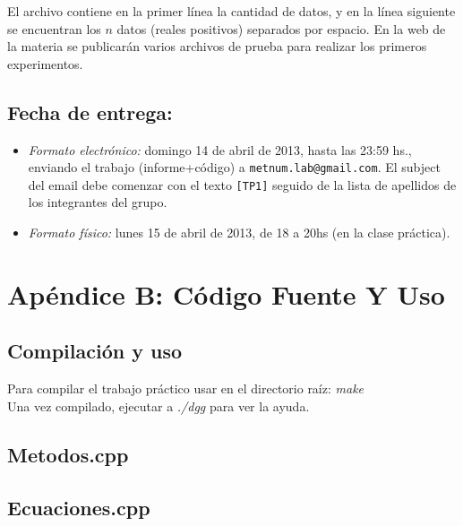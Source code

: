 \documentclass[a4paper,10pt,twoside]{article}
\begin{document}
\vspace{0.5cm}

El archivo contiene en la primer l\'inea la cantidad de datos, y en la l\'inea siguiente se encuentran los $n$ datos (reales positivos) separados por espacio. En la web de la materia se publicar\'an varios archivos de prueba para realizar los primeros experimentos.

\subsection{Fecha de entrega:} 

\begin{itemize}
\item \textsl{Formato electr\'onico:} domingo 14 de abril de 2013, hasta las 23:59 hs., enviando el trabajo (informe+c\'odigo) a \texttt{metnum.lab@gmail.com}. El subject del email debe comenzar con el texto \verb|[TP1]| seguido de la lista de apellidos de los integrantes del grupo. 
\item \textsl{Formato f\'isico:} lunes 15 de abril de 2013, de 18 a 20hs (en la clase pr\'actica).
\end{itemize}




\section{Apéndice B: Código Fuente Y Uso}
\subsection{Compilaci\'on y uso}
Para compilar el trabajo práctico usar en el directorio raíz: \emph{make} \\
Una vez compilado, ejecutar a \emph{./dgg} para ver la ayuda.
\subsection{Metodos.cpp}

\subsection{Ecuaciones.cpp}

\end{document}
